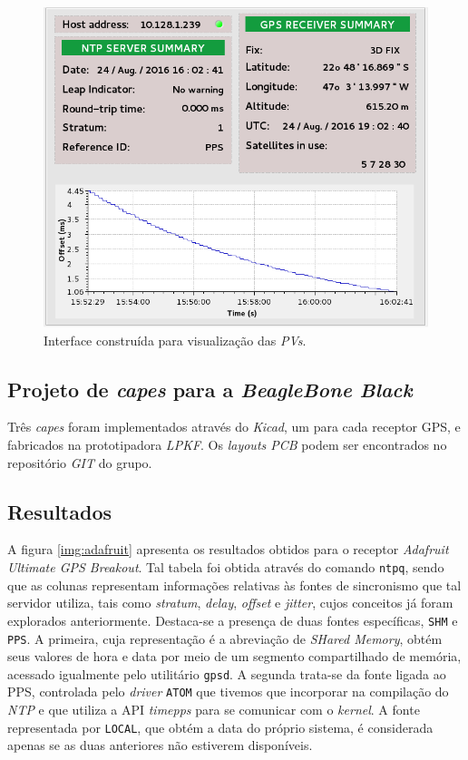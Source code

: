\begin{figure}[h]
    
    \centering
    \includegraphics[scale=0.35]{image/epics-opi-ntpgps}
    \caption {Interface construída para visualização das
    \textit{PVs}.}
    \label{img:ntp-opi} 
\end{figure} 

 
\subsection{Projeto de \textit{capes} para a \textit{BeagleBone Black}}

Três \textit{capes} foram implementados através do \textit{Kicad}, um para cada
receptor GPS, e fabricados na prototipadora \textit{LPKF}. Os \textit{layouts
PCB} podem ser encontrados no repositório \textit{GIT} do grupo.

\subsection{Resultados}

A figura \ref{img:adafruit} apresenta os resultados obtidos para o receptor
\textit{Adafruit Ultimate GPS Breakout}. Tal tabela foi obtida através do
comando \texttt{ntpq}, sendo que as colunas representam informações relativas às fontes de sincronismo que
tal servidor utiliza, tais como \textit{stratum}, \textit{delay},
\textit{offset} e \textit{jitter}, cujos conceitos já foram explorados
anteriormente. Destaca-se a presença de duas fontes específicas, \texttt{SHM} e
\texttt{PPS}. A primeira, cuja representação é a abreviação de \textit{SHared
Memory}, obtém seus valores de hora e data por meio de um segmento compartilhado de memória,
acessado igualmente pelo utilitário \texttt{gpsd}. A segunda trata-se da fonte
ligada ao PPS, controlada pelo \textit{driver} \texttt{ATOM} que tivemos que
incorporar na compilação do \textit{NTP} e que utiliza a API \textit{timepps}
para se comunicar com o \textit{kernel}. A fonte representada por
\texttt{LOCAL}, que obtém a data do próprio sistema, é considerada apenas se as duas anteriores
não estiverem disponíveis.

